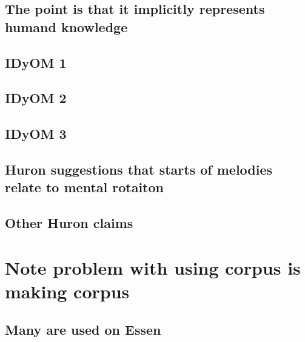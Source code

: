 \documentclass[]{book}
\theoremstyle{definition}
\theoremstyle{definition}
\theoremstyle{definition}
\theoremstyle{remark}
\begin{document}
\hypertarget{the-point-is-that-it-implicitly-represents-humand-knowledge}{%
\subsection{The point is that it implicitly represents humand
knowledge}\label{the-point-is-that-it-implicitly-represents-humand-knowledge}}

\hypertarget{idyom-1}{%
\subsection{IDyOM 1}\label{idyom-1}}

\hypertarget{idyom-2}{%
\subsection{IDyOM 2}\label{idyom-2}}

\hypertarget{idyom-3}{%
\subsection{IDyOM 3}\label{idyom-3}}

\hypertarget{huron-suggestions-that-starts-of-melodies-relate-to-mental-rotaiton}{%
\subsection{Huron suggestions that starts of melodies relate to mental
rotaiton}\label{huron-suggestions-that-starts-of-melodies-relate-to-mental-rotaiton}}

\hypertarget{other-huron-claims}{%
\subsection{Other Huron claims}\label{other-huron-claims}}

\hypertarget{note-problem-with-using-corpus-is-making-corpus}{%
\section{Note problem with using corpus is making
corpus}\label{note-problem-with-using-corpus-is-making-corpus}}

\hypertarget{many-are-used-on-essen}{%
\subsection{Many are used on Essen}\label{many-are-used-on-essen}}
\end{document}
